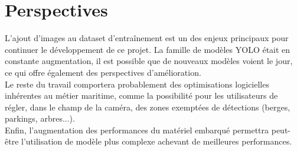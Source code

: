 \chapter{Perspectives}

L'ajout d'images au dataset d'entraînement est un des enjeux principaux 
pour continuer le développement de ce projet. 
La famille de modèles YOLO était en constante augmentation, 
il est possible que de nouveaux modèles voient le jour, 
ce qui offre également des perspectives d'amélioration. \\

Le reste du travail comportera probablement des optimisations 
logicielles inhérentes au métier maritime, comme la possibilité 
pour les utilisateurs de régler, dans le champ de la caméra,
des zones exemptées de détections (berges, parkings, arbres...). \\

Enfin, l'augmentation des performances du matériel embarqué 
permettra peut-être l'utilisation de modèle plus complexe 
achevant de meilleures performances. \\